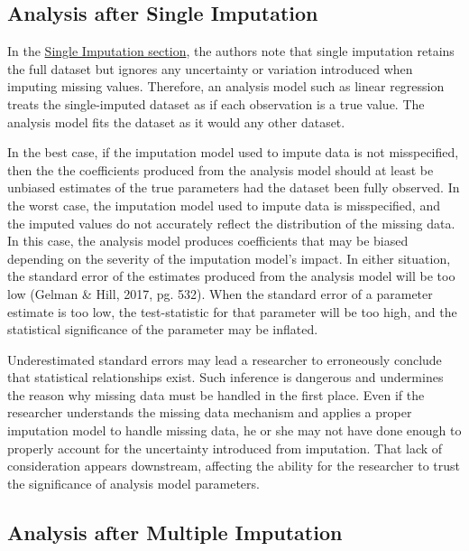 \documentclass[12pt,oneside]{chicagocapstone}
\begin{document}
\subsection*{Analysis after Single
Imputation}\label{background-analysis-single}

In the \protect\hyperlink{background-single-imputation}{Single
Imputation section}, the authors note that single imputation retains the
full dataset but ignores any uncertainty or variation introduced when
imputing missing values. Therefore, an analysis model such as linear
regression treats the single-imputed dataset as if each observation is a
true value. The analysis model fits the dataset as it would any other
dataset.

In the best case, if the imputation model used to impute data is not
misspecified, then the the coefficients produced from the analysis model
should at least be unbiased estimates of the true parameters had the
dataset been fully observed. In the worst case, the imputation model
used to impute data is misspecified, and the imputed values do not
accurately reflect the distribution of the missing data. In this case,
the analysis model produces coefficients that may be biased depending on
the severity of the imputation model's impact. In either situation, the
standard error of the estimates produced from the analysis model will be
too low (Gelman \& Hill, 2017, pg. 532). When the standard error of a
parameter estimate is too low, the test-statistic for that parameter
will be too high, and the statistical significance of the parameter may
be inflated.

Underestimated standard errors may lead a researcher to erroneously
conclude that statistical relationships exist. Such inference is
dangerous and undermines the reason why missing data must be handled in
the first place. Even if the researcher understands the missing data
mechanism and applies a proper imputation model to handle missing data,
he or she may not have done enough to properly account for the
uncertainty introduced from imputation. That lack of consideration
appears downstream, affecting the ability for the researcher to trust
the significance of analysis model parameters.

\subsection*{Analysis after Multiple
Imputation}\label{background-analysis-multiple}
\end{document}
